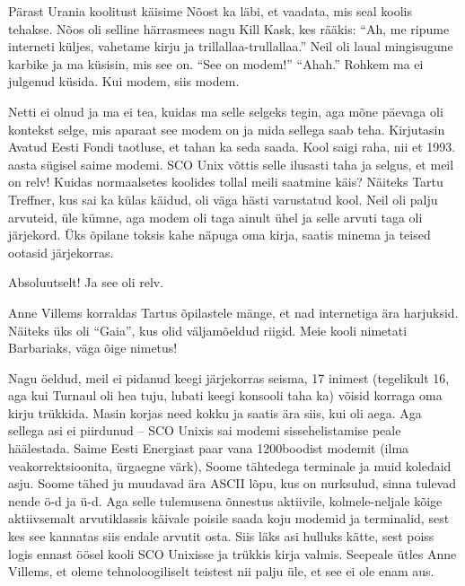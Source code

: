Pärast Urania koolitust käisime Nõost 
ka läbi, et vaadata, mis seal koolis tehakse. Nõos oli 
selline härrasmees nagu Kill Kask, kes rääkis: \enquote{Ah, me ripume interneti küljes, vahetame kirju ja 
trillallaa-trullallaa.} Neil oli laual mingisugune karbike ja ma küsisin, mis see on. 
\enquote{See on modem!} \enquote{Ahah.} Rohkem ma ei julgenud küsida. Kui 
modem, siis modem. 

Netti ei olnud ja ma ei tea, kuidas ma selle 
selgeks tegin, aga mõne päevaga oli kontekst selge, mis aparaat see modem on 
ja mida sellega saab teha. Kirjutasin Avatud Eesti Fondi 
taotluse, et tahan ka seda saada. Kool 
saigi raha, nii et 1993. aasta sügisel saime modemi. 
SCO Unix võttis selle ilusasti taha ja selgus, et meil 
on relv! Kuidas normaalsetes koolides tollal meili saatmine käis?
Näiteks Tartu Treffner, kus sai ka külas 
käidud, oli väga hästi varustatud kool. Neil oli palju arvuteid, üle kümne, aga modem 
oli taga ainult ühel ja selle arvuti taga oli järjekord. Üks õpilane toksis
kahe näpuga oma kirja, saatis minema ja teised ootasid järjekorras.


Absoluutselt! Ja see oli relv. 

Anne Villems korraldas Tartus
õpilastele mänge, et nad internetiga ära harjuksid. Näiteks üks oli \enquote{Gaia}, kus olid väljamõeldud riigid. Meie kooli nimetati Barbariaks, 
väga õige nimetus!

Nagu öeldud, meil ei pidanud keegi järjekorras seisma, 17 inimest (tegelikult 16, aga 
kui Turnaul oli hea tuju, lubati keegi konsooli taha 
ka) võisid korraga oma kirju trükkida. Masin korjas need kokku ja saatis ära
siis, kui oli aega. Aga sellega asi ei piirdunud -- SCO 
Unixis sai modemi sissehelistamise peale häälestada. Saime Eesti Energiast paar vana 1200boodist modemit (ilma veakorrektsioonita, 
ürgaegne värk), Soome tähtedega terminale ja muid
koledaid asju. Soome tähed ju muudavad ära ASCII lõpu, kus on nurksulud, sinna 
tulevad nende ö-d ja ü-d. Aga selle tulemusena õnnestus aktiivile, 
kolmele-neljale kõige aktiivsemalt arvutiklassis käivale poisile saada koju 
modemid ja terminalid, sest kes see kannatas siis endale arvutit osta. Siis
läks asi hulluks kätte, sest poiss logis ennast öösel kooli SCO 
Unixisse ja trükkis kirja valmis. Seepeale ütles Anne Villems, et oleme tehnoloogiliselt teistest nii palju üle, et 
see ei ole enam aus. 

